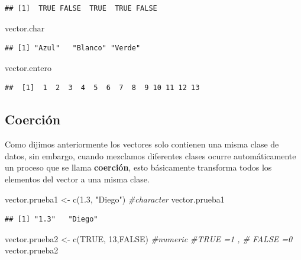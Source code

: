 \documentclass[
  12pt,
]{book}
\newenvironment{Shaded}{\begin{snugshade}}{\end{snugshade}}
\newcommand{\CommentTok}[1]{\textcolor[rgb]{0.56,0.35,0.01}{\textit{#1}}}
\newcommand{\ConstantTok}[1]{\textcolor[rgb]{0.00,0.00,0.00}{#1}}
\newcommand{\DecValTok}[1]{\textcolor[rgb]{0.00,0.00,0.81}{#1}}
\newcommand{\FloatTok}[1]{\textcolor[rgb]{0.00,0.00,0.81}{#1}}
\newcommand{\FunctionTok}[1]{\textcolor[rgb]{0.00,0.00,0.00}{#1}}
\newcommand{\NormalTok}[1]{#1}
\newcommand{\OtherTok}[1]{\textcolor[rgb]{0.56,0.35,0.01}{#1}}
\newcommand{\StringTok}[1]{\textcolor[rgb]{0.31,0.60,0.02}{#1}}
\begin{document}
\begin{verbatim}
## [1]  TRUE FALSE  TRUE  TRUE FALSE
\end{verbatim}

\begin{Shaded}
\begin{Highlighting}[]
\NormalTok{vector.char}
\end{Highlighting}
\end{Shaded}

\begin{verbatim}
## [1] "Azul"   "Blanco" "Verde"
\end{verbatim}

\begin{Shaded}
\begin{Highlighting}[]
\NormalTok{vector.entero }
\end{Highlighting}
\end{Shaded}

\begin{verbatim}
##  [1]  1  2  3  4  5  6  7  8  9 10 11 12 13
\end{verbatim}

\hypertarget{coerciuxf3n}{%
\subsection{\texorpdfstring{\textbf{Coerción}}{Coerción}}\label{coerciuxf3n}}

Como dijimos anteriormente los vectores solo contienen una misma clase de datos, sin embargo, cuando mezclamos diferentes clases ocurre automáticamente un proceso que se llama \textbf{coerción}, esto básicamente transforma todos los elementos del vector a una misma clase.

\begin{Shaded}
\begin{Highlighting}[]
\NormalTok{vector.prueba1 }\OtherTok{\textless{}{-}} \FunctionTok{c}\NormalTok{(}\FloatTok{1.3}\NormalTok{, }\StringTok{"Diego"}\NormalTok{) }\CommentTok{\#character}
\NormalTok{vector.prueba1}
\end{Highlighting}
\end{Shaded}

\begin{verbatim}
## [1] "1.3"   "Diego"
\end{verbatim}

\begin{Shaded}
\begin{Highlighting}[]
\NormalTok{vector.prueba2 }\OtherTok{\textless{}{-}} \FunctionTok{c}\NormalTok{(}\ConstantTok{TRUE}\NormalTok{, }\DecValTok{13}\NormalTok{,}\ConstantTok{FALSE}\NormalTok{) }\CommentTok{\#numeric  \#TRUE =1 , \# FALSE =0}
\NormalTok{vector.prueba2 }
\end{Highlighting}
\end{Shaded}
\end{document}
